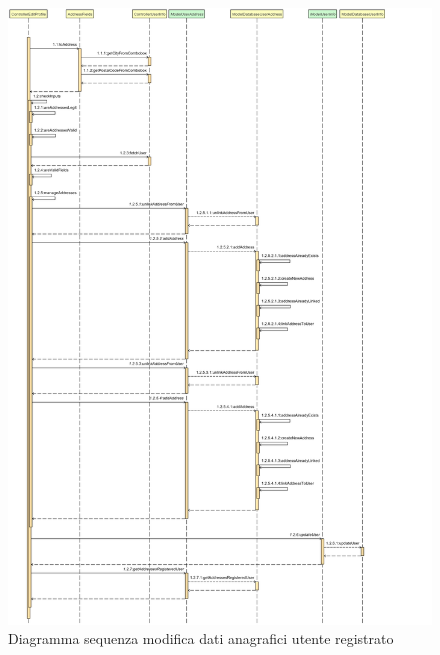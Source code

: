 \documentclass[a4paper,11pt]{report}
\begin{document}
\begin{figure}[h!]
    	\centering
    	\hspace*{-0.4in}
    	\includegraphics[width=1.0\linewidth]{Sequence diagrams/1 Registered user/updateProfile.png}
    	\caption{Diagramma sequenza modifica dati anagrafici utente registrato}
    \end{figure} \leavevmode \\
\end{document}
